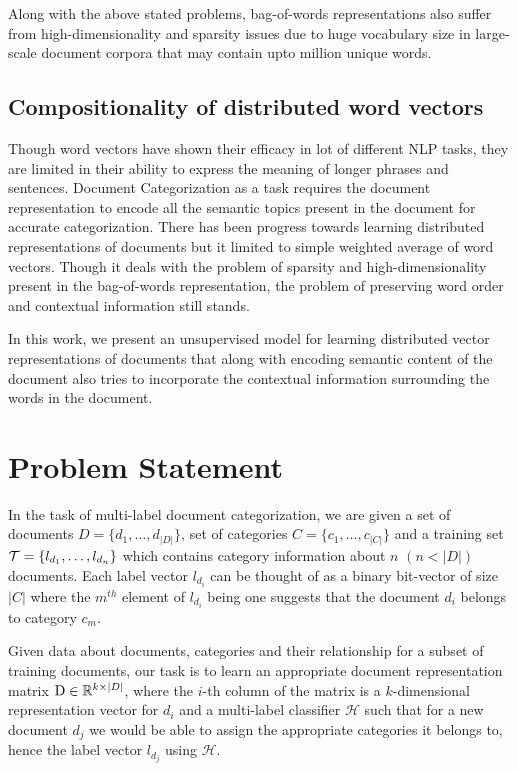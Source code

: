 Along with the above stated problems, bag-of-words representations also suffer from high-dimensionality and sparsity issues due to huge vocabulary size in large-scale document corpora that may contain upto million unique words.

\subsection{Compositionality of distributed word vectors}
Though word vectors have shown their efficacy in lot of different NLP tasks, they are limited in their ability to express the meaning of longer phrases and sentences. Document Categorization as a task requires the document representation to encode all the semantic topics present in the document for accurate categorization. There has been progress towards learning distributed representations of documents but it limited to simple weighted average of word vectors. Though it deals with the problem of sparsity and high-dimensionality present in the bag-of-words representation, the problem of preserving word order and contextual information still stands.

In this work, we present an unsupervised model for learning distributed vector representations of documents that along with encoding semantic content of the document also tries to incorporate the contextual information surrounding the words in the document.

\section{Problem Statement}	
In the task of multi-label document categorization, we are given a set of documents $D = \{d_{1}, \ldots, d_{|D|}\}$, set of categories $C = \{c_{1}, \ldots, c_{|C|}\}$ and a training set $\mathcal{T} = \{l_{d_{1}}, \ldots, l_{d_{n}}\}$ which contains category information about $n$ $(n < |D|)$ documents. Each label vector $l_{d_{i}}$ can be thought of as a binary bit-vector of size $|C|$ where the $m^{th}$ element of $l_{d_{i}}$ being one suggests that the document $d_{i}$ belongs to category $c_{m}$.  

Given data about documents, categories and their relationship for a subset of training documents, our task is to learn an appropriate document representation matrix $\mathrm{D} \in \mathbb{R}^{k \times |D|}$, where the $i$-th column of the matrix is a $k$-dimensional representation vector for $d_{i}$ and a multi-label classifier $\mathcal{H}$ such that for a new document $d_{j}$ we would be able to assign the appropriate categories it belongs to, hence the label vector $l_{d_{j}}$ using $\mathcal{H}$.

